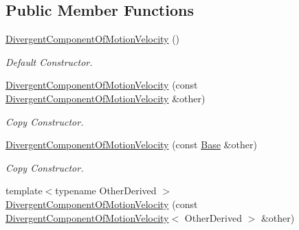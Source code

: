 \subsection*{Public Member Functions}
\begin{DoxyCompactItemize}
\item 
\hyperlink{classow__core_1_1DivergentComponentOfMotionVelocity_a367e84c2bbef062fff3f7fa0c884883e}{Divergent\+Component\+Of\+Motion\+Velocity} ()\hypertarget{classow__core_1_1DivergentComponentOfMotionVelocity_a367e84c2bbef062fff3f7fa0c884883e}{}\label{classow__core_1_1DivergentComponentOfMotionVelocity_a367e84c2bbef062fff3f7fa0c884883e}

\begin{DoxyCompactList}\small\item\em Default Constructor. \end{DoxyCompactList}\item 
\hyperlink{classow__core_1_1DivergentComponentOfMotionVelocity_a9dc27871e42970d79a34d6a86e4e2226}{Divergent\+Component\+Of\+Motion\+Velocity} (const \hyperlink{classow__core_1_1DivergentComponentOfMotionVelocity}{Divergent\+Component\+Of\+Motion\+Velocity} \&other)\hypertarget{classow__core_1_1DivergentComponentOfMotionVelocity_a9dc27871e42970d79a34d6a86e4e2226}{}\label{classow__core_1_1DivergentComponentOfMotionVelocity_a9dc27871e42970d79a34d6a86e4e2226}

\begin{DoxyCompactList}\small\item\em Copy Constructor. \end{DoxyCompactList}\item 
\hyperlink{classow__core_1_1DivergentComponentOfMotionVelocity_ab3097772a1be872104bbd0dc5ce286ac}{Divergent\+Component\+Of\+Motion\+Velocity} (const \hyperlink{classow__core_1_1LinearVelocity}{Base} \&other)\hypertarget{classow__core_1_1DivergentComponentOfMotionVelocity_ab3097772a1be872104bbd0dc5ce286ac}{}\label{classow__core_1_1DivergentComponentOfMotionVelocity_ab3097772a1be872104bbd0dc5ce286ac}

\begin{DoxyCompactList}\small\item\em Copy Constructor. \end{DoxyCompactList}\item 
{\footnotesize template$<$typename Other\+Derived $>$ }\\\hyperlink{classow__core_1_1DivergentComponentOfMotionVelocity_aa726db42e18d191f02ee9af171e57db7}{Divergent\+Component\+Of\+Motion\+Velocity} (const \hyperlink{classow__core_1_1DivergentComponentOfMotionVelocity}{Divergent\+Component\+Of\+Motion\+Velocity}$<$ Other\+Derived $>$ \&other)\hypertarget{classow__core_1_1DivergentComponentOfMotionVelocity_aa726db42e18d191f02ee9af171e57db7}{}\label{classow__core_1_1DivergentComponentOfMotionVelocity_aa726db42e18d191f02ee9af171e57db7}


\end{DoxyCompactItemize}

